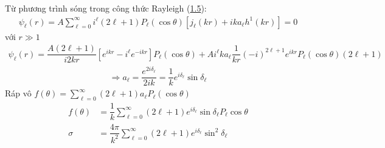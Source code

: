 \documentclass{report}
\renewcommand{\l}{\ell}
\newcommand{\f}[2]{\dfrac{#1}{#2}}
\begin{document}
Từ phương trình sóng trong công thức Rayleigh (\hyperref[eq1.5]{1.5}):
\begin{align*}
	\psi_{\l}(r) = A\sum_{\l=0}^{\infty}i^{\l}(2\l+1)P_{\l}(\cos\theta)\left[ j_{\l} (kr)+ika_{\l}h^{1}(kr) \right] = 0
\end{align*}
với $r\gg1$
\begin{align*}
	\psi_{\l}(r) = \f{A(2\l+1)}{i2kr}\left[e^{ikr} - i^{\l} e^{-ikr} \right] P_{\l}(\cos\theta) + A i^{\l}ka_{\l}\f{1}{kr}(-i)^{2\l+1}e^{ikr}P_{\l}(\cos\theta)(2\l+1)
\end{align*}
\begin{align}
	\Rightarrow a_{\l} = \f{e^{2i\delta_{\l}}}{2ik} = \f{1}{k}e^{i\delta_{\l}}\sin\delta_{\l}
\end{align}
Ráp vô $f(\theta)  = \sum_{\l=0}^{\infty}(2\l+1)a_{\l} P_{\l}(\cos\theta)$
\begin{align}
	f(\theta) & = \f{1}{k} \sum_{\l = 0}^{\infty}(2\l + 1)e^{i\delta_{\l}}\sin\delta_{\l} P_{\l}\cos\theta \\
	\sigma    & = \f{4\pi}{k^2} \sum_{\l = 0}^{\infty}(2\l + 1)e^{i\delta_{\l}}\sin^{2}\delta_{\l}
\end{align}
\end{document}
